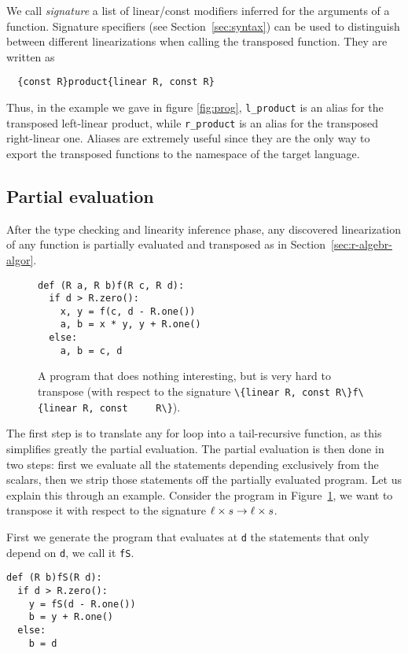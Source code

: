 \ifafourps\enlargethispage{\baselineskip}\fi
We call \emph{signature} a list of linear/const
modifiers inferred for the arguments of a function. Signature
specifiers (see Section~\ref{sec:syntax}) can be used to distinguish
between different linearizations when calling the transposed
function. They are written as
\begin{lstlisting}
  {const R}product{linear R, const R}
\end{lstlisting}

Thus, in the example we gave in figure \ref{fig:prog},
\lstinline+l_product+ is an alias for the transposed left-linear
product, while \lstinline+r_product+ is an alias for the transposed
right-linear one. Aliases are extremely useful since they are the only
way to export the transposed functions to the namespace of the target
language.




\subsection{Partial evaluation}
\label{sec:partial-evaluation-1}
After the type checking and linearity inference phase, any discovered
linearization of any function is partially evaluated and transposed as
in Section~\ref{sec:r-algebr-algor}.

\begin{figure}[\ifafive t\else b\fi]
\begin{lstlisting}
def (R a, R b)f(R c, R d):
  if d > R.zero():
    x, y = f(c, d - R.one())
    a, b = x * y, y + R.one()
  else:
    a, b = c, d
\end{lstlisting}
  \caption{\label{fig:bad}A \tALpy{} program that does nothing
    interesting, but is very hard to transpose (with respect to the
    signature \lstinline+\{linear R, const R\}f\{linear R, const
    R\}+).}
\end{figure}


The first step is to translate any for loop into a tail-recursive
function, as this simplifies greatly the partial evaluation. The
partial evaluation is then done in two steps: first we evaluate all
the statements depending exclusively from the scalars, then we strip
those statements off the partially evaluated program. Let us explain
this through an example. Consider the program in Figure~\ref{fig:bad},
we want to transpose it with respect to the signature $\ell\times
s\rightarrow\ell\times s$.

First we generate the program that evaluates at \lstinline+d+ the
statements that only depend on \lstinline+d+, we call it
\lstinline+fS+.
\begin{lstlisting}
def (R b)fS(R d):
  if d > R.zero():
    y = fS(d - R.one())
    b = y + R.one()
  else:
    b = d
\end{lstlisting}

